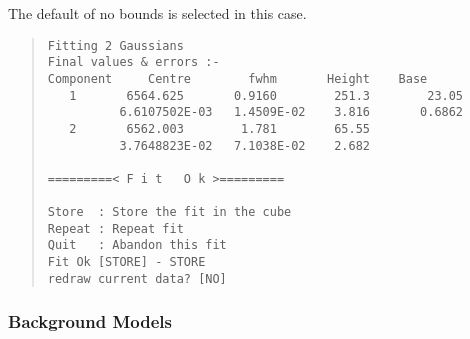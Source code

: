 The default of no bounds is selected in this case.
\begin{quote}\begin{verbatim}
Fitting 2 Gaussians
Final values & errors :-
Component     Centre        fwhm       Height    Base
   1       6564.625       0.9160        251.3        23.05
          6.6107502E-03   1.4509E-02    3.816       0.6862
   2       6562.003        1.781        65.55
          3.7648823E-02   7.1038E-02    2.682

=========< F i t   O k >=========

Store  : Store the fit in the cube
Repeat : Repeat fit
Quit   : Abandon this fit
Fit Ok [STORE] - STORE
redraw current data? [NO]
\end{verbatim}\end{quote}

\subsubsection{Background Models}

